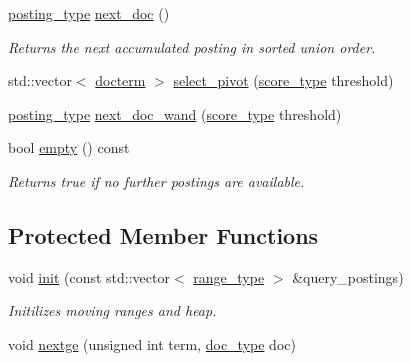 \begin{DoxyCompactItemize}
\mbox{\hyperlink{classirk_1_1union__range_ac125c83e17d473ee5480fef76cfe42f9}{posting\+\_\+type}} \mbox{\hyperlink{classirk_1_1union__range_a8c5c42595554997abba7ce81c4e8251a}{next\+\_\+doc}} ()
\begin{DoxyCompactList}\small\item\em Returns the next {\itshape accumulated posting} in sorted union order. \end{DoxyCompactList}\item 
std\+::vector$<$ \mbox{\hyperlink{structirk_1_1union__range_1_1docterm}{docterm}} $>$ \mbox{\hyperlink{classirk_1_1union__range_a55d2c36c722c0d865783188eb8e9c584}{select\+\_\+pivot}} (\mbox{\hyperlink{classirk_1_1union__range_af728218b976df464ebb051a9e5358e93}{score\+\_\+type}} threshold)
\item 
\mbox{\hyperlink{classirk_1_1union__range_ac125c83e17d473ee5480fef76cfe42f9}{posting\+\_\+type}} \mbox{\hyperlink{classirk_1_1union__range_a230fb4a5ca924c3d7407baec393c53b7}{next\+\_\+doc\+\_\+wand}} (\mbox{\hyperlink{classirk_1_1union__range_af728218b976df464ebb051a9e5358e93}{score\+\_\+type}} threshold)
\item 
bool \mbox{\hyperlink{classirk_1_1union__range_a661cc5c6767ecd8b468e5b13fb6460f5}{empty}} () const
\begin{DoxyCompactList}\small\item\em Returns true if no further postings are available. \end{DoxyCompactList}\end{DoxyCompactItemize}
\subsection*{Protected Member Functions}
\begin{DoxyCompactItemize}
\item 
void \mbox{\hyperlink{classirk_1_1union__range_a0bd95ecb10bd2f8ee81c5bd23aad3935}{init}} (const std\+::vector$<$ \mbox{\hyperlink{classirk_1_1union__range_aae1621f1e73b1b78990ad11eaa52452b}{range\+\_\+type}} $>$ \&query\+\_\+postings)
\begin{DoxyCompactList}\small\item\em Initilizes moving ranges and heap. \end{DoxyCompactList}\item 
void \mbox{\hyperlink{classirk_1_1union__range_ad195345c32357a6269333a45dd785da8}{nextge}} (unsigned int term, \mbox{\hyperlink{classirk_1_1union__range_aa502a10f2f5c682199072c0ba11a77a9}{doc\+\_\+type}} doc)
\end{DoxyCompactItemize}
